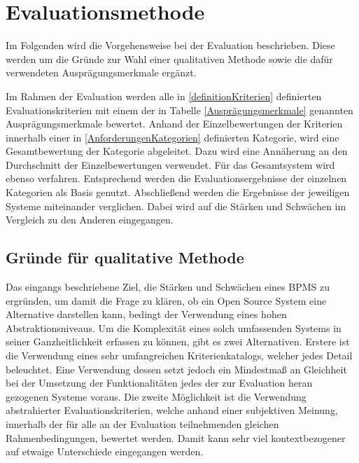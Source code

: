 
\section{Evaluationsmethode}
\label{methode}
Im Folgenden wird die Vorgehensweise bei der Evaluation beschrieben. Diese werden um die Gründe zur Wahl einer qualitativen Methode sowie die dafür verwendeten Ausprägungsmerkmale ergänzt. 

\medskip\noindent Im Rahmen der Evaluation werden alle in \ref{definitionKriterien} definierten Evaluationskriterien mit einem der in Tabelle \ref{Ausprägungsmerkmale} genannten Ausprägungsmerkmale bewertet. Anhand der Einzelbewertungen der Kriterien innerhalb einer in \ref{AnforderungenKategorien} definierten Kategorie, wird eine Gesamtbewertung der Kategorie abgeleitet. Dazu wird eine Annäherung an den Durchschnitt der Einzelbewertungen verwendet. Für das Gesamtsystem wird ebenso verfahren. Entsprechend werden die Evaluationsergebnisse der einzelnen Kategorien als Basis genutzt.
Abschließend werden die Ergebnisse der jeweiligen Systeme miteinander verglichen. Dabei wird auf die Stärken und Schwächen im Vergleich zu den Anderen eingegangen.


\subsection{Gründe für qualitative Methode}
\label{gründeQualitativ}
Das eingangs beschriebene Ziel, die Stärken und Schwächen eines \ac{BPMS} zu ergründen, um damit die Frage  zu klären, ob ein Open Source System eine Alternative darstellen kann, bedingt der Verwendung eines hohen Abstraktionsniveaus. Um die Komplexität eines solch umfassenden Systems in seiner Ganzheitlichkeit erfassen zu können, gibt es zwei Alternativen. Erstere ist die Verwendung eines sehr umfangreichen Kriterienkatalogs, welcher jedes Detail beleuchtet. Eine Verwendung dessen setzt jedoch ein Mindestmaß an Gleichheit bei der Umsetzung der Funktionalitäten jedes der zur Evaluation heran gezogenen Systeme voraus. Die zweite Möglichkeit ist die Verwendung abstrahierter Evaluationskriterien, welche anhand einer subjektiven Meinung, innerhalb der für alle an der Evaluation teilnehmenden gleichen Rahmenbedingungen, bewertet werden. Damit kann sehr viel kontextbezogener auf etwaige Unterschiede eingegangen werden.


